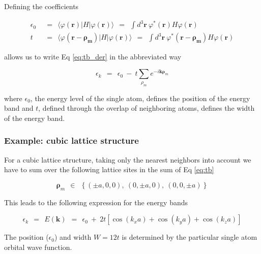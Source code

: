\documentclass[10pt]{report}
\numberwithin{equation}{chapter}
\newcommand{\refEq}[1]{
  Eq  \ref{#1}
}
\begin{document}
Defining the coefficients 

\begin{align}
  \epsilon_0 ~~& =~~ \langle \varphi(\mathbf{r}) | H | \varphi(\mathbf{r}) \rangle  ~~=~~
  \int d^3\mathbf{r}\ \varphi^*(\mathbf{r}) H \varphi(\mathbf{r}) \\
  t ~~& =~~ \langle \varphi(\mathbf{r} - \mathbf{\rho_m}) |H| \varphi(\mathbf{r}) \rangle 
  ~~=~~ \int d^3\mathbf{r}\ \varphi^*(\mathbf{r} - \mathbf{\rho_m}) H \varphi(\mathbf{r})
\end{align}

allows us to write \refEq{eq:tb_der} in the abbreviated way

\begin{equation} \label{eq:tb}
  \epsilon_k ~~=~~ \epsilon_0 ~-~ t \sum_{\rho_m} e^{-i\mathbf{k} \mathbf{\rho}_m}
\end{equation}

where $\epsilon_0$, the energy level of the single atom, defines the position of the energy band and $t$, defined through the overlap of neighboring atoms, defines the width of the energy band.


\subsubsection{Example: cubic lattice structure}

For a cubic lattice structure, taking only the nearest neighbors into account we have to sum over the following lattice sites in the sum of \refEq{eq:tb}

\begin{equation}
  \mathbf{\rho}_m ~~\in~~ \left\{ (\pm a,0 ,0),~ (0, \pm a, 0),~ (0, 0, \pm a) \right\}
\end{equation}

This leads to the following expression for the energy bands

\begin{equation}
  \epsilon_k ~~=~~ E(\mathbf{k}) ~~=~~ \epsilon_0 ~+~ 2t \left[ \cos(k_xa) + \cos(k_ya) + \cos(k_za) \right]
\end{equation}

The position ($\epsilon_0$) and width $W=12t$ is determined by the particular single atom orbital wave function.


%
\end{document}
